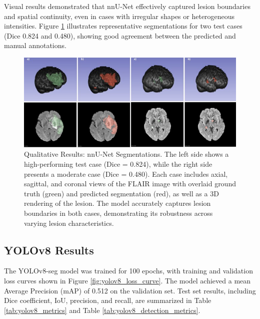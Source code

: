 \documentclass[12pt]{article}
\begin{document}
Visual results demonstrated that nnU-Net effectively captured lesion boundaries and spatial continuity, even in cases with irregular shapes or heterogeneous intensities. Figure \ref{fig:nnunet_qualitative} illustrates representative segmentations for two test cases (Dice 0.824 and 0.480), showing good agreement between the predicted and manual annotations.

\begin{figure}[tp]    
    \centering
    \includegraphics[width=\textwidth]{figures/Figure 4.jpg}
    \caption{Qualitative Results: nnU-Net Segmentations. The left side shows a high-performing test case (Dice = 0.824), while the right side presents a moderate case (Dice = 0.480). Each case includes axial, sagittal, and coronal views of the FLAIR image with overlaid ground truth (green) and predicted segmentation (red), as well as a 3D rendering of the lesion. The model accurately captures lesion boundaries in both cases, demonstrating its robustness across varying lesion characteristics.}
    \label{fig:nnunet_qualitative}
\end{figure}


\subsection{YOLOv8 Results} \label{subsec:yolov8}

The YOLOv8-seg model was trained for 100 epochs, with training and validation loss curves shown in Figure \ref{fig:yolov8_loss_curve}. The model achieved a mean Average Precision (mAP) of 0.512 on the validation set. Test set results, including Dice coefficient, IoU, precision, and recall, are summarized in Table \ref{tab:yolov8_metrics} and Table \ref{tab:yolov8_detection_metrics}.
\end{document}

